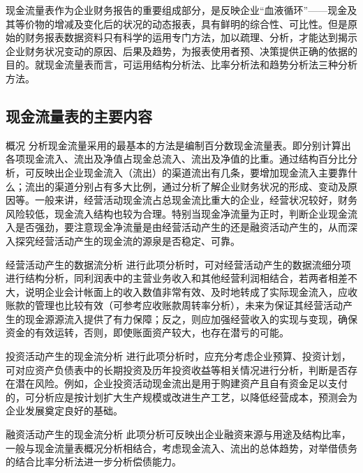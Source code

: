     现金流量表作为企业财务报告的重要组成部分，是反映企业“血液循环”——现金及其等价物的增减及变化后的状况的动态报表，具有鲜明的综合性、可比性。但是原始的财务报表数据资料只有科学的运用专门方法，加以疏理、分析，才能达到揭示企业财务状况变动的原因、后果及趋势，为报表使用者预、决策提供正确的依据的目的。就现金流量表而言，可运用结构分析法、比率分析法和趋势分析法三种分析方法。

\subsection {现金流量表的主要内容}

    \begin{enumerate.zh}
        \item  概况 分析现金流量采用的最基本的方法是编制百分数现金流量表。即分别计算出各项现金流入、流出及净值占现金总流入、流出及净值的比重。通过结构百分比分析，可反映出企业现金流入（流出）的渠道流出有几条，要增加现金流入主要靠什么；流出的渠道分别占有多大比例，通过分析了解企业财务状况的形成、变动及原因等。一般来讲，经营活动现金流占总现金流比重大的企业，经营状况较好，财务风险较低，现金流入结构也较为合理。特别当现金净流量为正时，判断企业现金流入是否强劲，要注意现金净流量是由经营活动产生的还是融资活动产生的，从而深入探究经营活动产生的现金流的源泉是否稳定、可靠。

        \item  经营活动产生的数据流分析 进行此项分析时，可对经营活动产生的数据流细分项进行结构分析，同利润表中的主营业务收入和其他经营利润相结合，若两者相差不大，说明企业会计帐面上的收入数值非常有效、及时地转成了实际现金流入，应收账款的管理也比较有效（可参考应收账款周转率分析），未来为保证其经营活动产生的现金源源流入提供了有力保障；反之，则应加强经营收入的实现与变现，确保资金的有效运转，否则，即使账面资产较大，也存在潜亏的可能。

        \item  投资活动产生的现金流分析 进行此项分析时，应充分考虑企业预算、投资计划，可对应资产负债表中的长期投资及历年投资收益等相关情况进行分析，判断是否存在潜在风险。例如，企业投资活动现金流出是用于购建资产且自有资金足以支付的，可分析应是按计划扩大生产规模或改进生产工艺，以降低经营成本，预测会为企业发展奠定良好的基础。

        \item  融资活动产生的现金流分析 此项分析可反映出企业融资来源与用途及结构比率，一般与现金流量表概况分析相结合，考虑现金流入、流出的总体趋势，对举借债务的结合比率分析法进一步分析偿债能力。
    \end{enumerate.zh}

